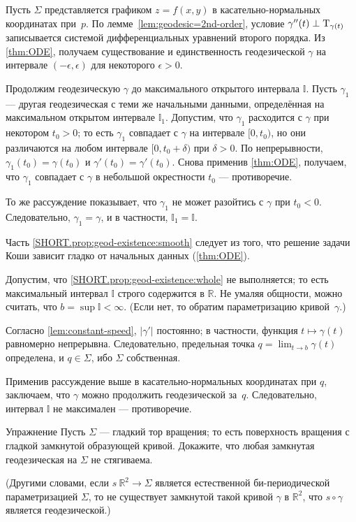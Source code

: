 Пусть $\Sigma$ представляется графиком $z=f(x,y)$ в касательно-нормальных координатах при~$p$.
По лемме~\ref{lem:geodesic=2nd-order}, условие $\gamma''(t)\perp\mathrm{T}_{\gamma(t)}$ записывается системой дифференциальных уравнений второго порядка.
Из \ref{thm:ODE}, получаем существование и единственность геодезической $\gamma$ на интервале $(-\epsilon,\epsilon)$ для некоторого $\epsilon>0$.

Продолжим геодезическую $\gamma$ до максимального открытого интервала $\mathbb{I}$.
Пусть $\gamma_1$ --- другая геодезическая с теми же начальными данными, определённая на максимальном открытом интервале $\mathbb{I}_1$.
Допустим, что $\gamma_1$ расходится с $\gamma$ при некотором $t_0>0$;
то есть $\gamma_1$ совпадает с $\gamma$ на интервале $[0,t_0)$, но они различаются на любом интервале $[0,t_0+\delta)$ при $\delta>0$.
По непрерывности, $\gamma_1(t_0)=\gamma(t_0)$ и $\gamma'(t_0)=\gamma'(t_0)$.
Снова применив \ref{thm:ODE}, получаем, что $\gamma_1$ совпадает с $\gamma$ в небольшой окрестности $t_0$ --- противоречие.

То же рассуждение показывает, что $\gamma_1$ не может разойтись с $\gamma$ при $t_0<0$.
Следовательно, $\gamma_1=\gamma$, и в частности, $\mathbb{I}_1=\mathbb{I}$.

Часть \ref{SHORT.prop:geod-existence:smooth} следует из того, что решение задачи Коши зависит гладко от начальных данных (\ref{thm:ODE}).

Допустим, что \ref{SHORT.prop:geod-existence:whole} не выполняется;
то есть максимальный интервал $\mathbb{I}$ строго содержится в $\mathbb{R}$.
Не умаляя общности, можно считать, что $b=\sup\mathbb{I}<\infty$.
(Если нет, то обратим параметризацию кривой~$\gamma$.)

{\sloppy

Согласно \ref{lem:constant-speed}, $|\gamma'|$ постоянно; в частности, функция $t\mapsto \gamma(t)$ равномерно непрерывна.
Следовательно, предельная точка
$q=\lim_{t\to b}\gamma(t)$
определена, и $q\in \Sigma$, ибо $\Sigma$ собственная.

}

Применив рассуждение выше в касательно-нормальных координатах при $q$, заключаем, что $\gamma$ можно продолжить геодезической за~$q$.
Следовательно, интервал $\mathbb{I}$ не максимален --- противоречие.
\qeds

\begin{thm}{Упражнение}\label{ex:round-torus}
Пусть $\Sigma$ --- гладкий тор вращения; то есть поверхность вращения с гладкой замкнутой образующей кривой.
Докажите, что любая замкнутая геодезическая на $\Sigma$ не стягиваема.

(Другими словами, если $s\:\mathbb{R}^2\to \Sigma$ является естественной би-периодической параметризацией $\Sigma$, то
не существует замкнутой такой кривой $\gamma$ в $\mathbb{R}^2$, что $s\circ\gamma$ является геодезической.)
\end{thm}


